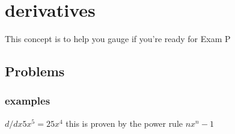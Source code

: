 \documentclass{article}
\author{Matthew Thomas }
\date{February 2020}
\begin{document}
\maketitle

\section{derivatives}
This concept is to help you gauge if you're ready for Exam P
\subsection{Problems}
\subsubsection{examples}$d/dx 5x^5=25x^4 $ this is proven by the power rule $ nx^n-1 $
\end{document}
